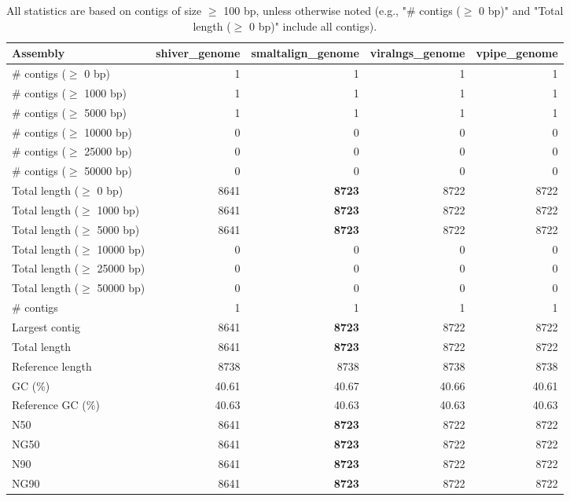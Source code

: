 \documentclass[12pt,a4paper]{article}
\begin{document}
\begin{table}[ht]
\begin{center}
\caption{All statistics are based on contigs of size $\geq$ 100 bp, unless otherwise noted (e.g., "\# contigs ($\geq$ 0 bp)" and "Total length ($\geq$ 0 bp)" include all contigs).}
\begin{tabular}{|l*{4}{|r}|}
\hline
Assembly & shiver\_genome & smaltalign\_genome & viralngs\_genome & vpipe\_genome \\ \hline
\# contigs ($\geq$ 0 bp) & 1 & 1 & 1 & 1 \\ \hline
\# contigs ($\geq$ 1000 bp) & 1 & 1 & 1 & 1 \\ \hline
\# contigs ($\geq$ 5000 bp) & 1 & 1 & 1 & 1 \\ \hline
\# contigs ($\geq$ 10000 bp) & 0 & 0 & 0 & 0 \\ \hline
\# contigs ($\geq$ 25000 bp) & 0 & 0 & 0 & 0 \\ \hline
\# contigs ($\geq$ 50000 bp) & 0 & 0 & 0 & 0 \\ \hline
Total length ($\geq$ 0 bp) & 8641 & {\bf 8723} & 8722 & 8722 \\ \hline
Total length ($\geq$ 1000 bp) & 8641 & {\bf 8723} & 8722 & 8722 \\ \hline
Total length ($\geq$ 5000 bp) & 8641 & {\bf 8723} & 8722 & 8722 \\ \hline
Total length ($\geq$ 10000 bp) & 0 & 0 & 0 & 0 \\ \hline
Total length ($\geq$ 25000 bp) & 0 & 0 & 0 & 0 \\ \hline
Total length ($\geq$ 50000 bp) & 0 & 0 & 0 & 0 \\ \hline
\# contigs & 1 & 1 & 1 & 1 \\ \hline
Largest contig & 8641 & {\bf 8723} & 8722 & 8722 \\ \hline
Total length & 8641 & {\bf 8723} & 8722 & 8722 \\ \hline
Reference length & 8738 & 8738 & 8738 & 8738 \\ \hline
GC (\%) & 40.61 & 40.67 & 40.66 & 40.61 \\ \hline
Reference GC (\%) & 40.63 & 40.63 & 40.63 & 40.63 \\ \hline
N50 & 8641 & {\bf 8723} & 8722 & 8722 \\ \hline
NG50 & 8641 & {\bf 8723} & 8722 & 8722 \\ \hline
N90 & 8641 & {\bf 8723} & 8722 & 8722 \\ \hline
NG90 & 8641 & {\bf 8723} & 8722 & 8722 \\ \hline

\end{tabular}
\end{center}
\end{table}
\end{document}
